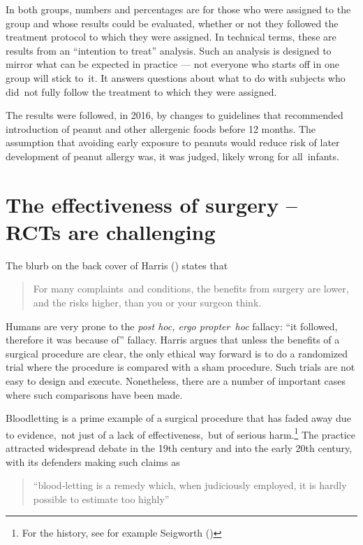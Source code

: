 \documentclass[
  10ptls,
  b5paper]{book}
\begin{document}
In both groups, numbers and percentages are for those who were assigned to the group and whose results could be evaluated, whether or not they followed the treatment protocol to which they were assigned. In technical terms, these are results from an ``intention to treat'' analysis. Such an analysis is designed to mirror what can be expected in practice --- not everyone who starts off in one group will stick to~it. It answers questions about what to do with subjects who did~not fully follow the treatment to which they were assigned.

The results were followed, in 2016, by changes to guidelines that recommended introduction of peanut and other allergenic foods before 12 months. The assumption that avoiding early exposure to peanuts would reduce risk of later development of peanut allergy was, it was judged, likely wrong for all~infants.

\section{The effectiveness of surgery -- RCTs are challenging}\label{the-effectiveness-of-surgery-rcts-are-challenging}

The blurb on the back cover of Harris () states that

\begin{quote}
For many complaints~and conditions, the benefits from surgery are lower, and the risks higher, than you or your surgeon think.
\end{quote}

Humans are very prone to the \emph{post hoc, ergo propter~hoc} fallacy: ``it followed, therefore it was because of'' fallacy. Harris argues that unless the benefits of a surgical procedure are clear, the only ethical way forward is to do a randomized trial where the procedure is compared with a sham procedure. Such trials are not easy to design and execute. Nonetheless, there are a number of important cases where such comparisons have been made.

Bloodletting is a prime example of a surgical procedure that has faded away due to evidence,~not just of a lack of effectiveness,~but of serious harm.\footnote{For the history, see for example Seigworth ()} The practice attracted widespread debate in the 19th century and into the early 20th century, with its defenders making such claims as

\begin{quote}
``blood-letting is a remedy which, when judiciously employed, it is hardly possible to estimate too highly''
\end{quote}
\end{document}
